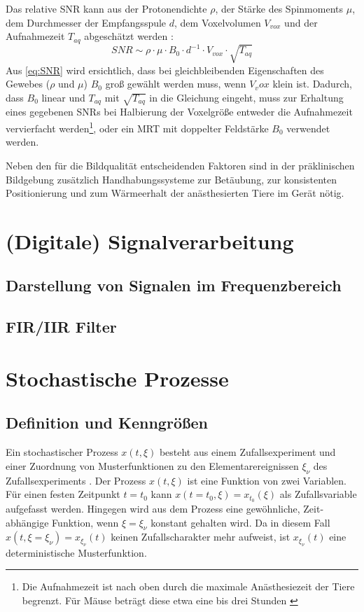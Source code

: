 Das relative SNR kann aus der Protonendichte $\rho$, der Stärke des Spinmoments $\mu$, dem Durchmesser der Empfangsspule $d$, dem Voxelvolumen $V_{vox}$ und der Aufnahmezeit $T_{aq}$ abgeschätzt werden \cite[S.~161]{Kiessling2017}:
\begin{equation}
\label{eq:SNR}
	SNR \sim \rho \cdot \mu \cdot B_0 \cdot d^{-1} \cdot V_{vox} \cdot \sqrt{T_{aq}}
\end{equation}
Aus \autoref{eq:SNR} wird ersichtlich, dass bei gleichbleibenden Eigenschaften des Gewebes ($\rho$ und $\mu$) $B_0$ groß gewählt werden muss, wenn $V_vox$ klein ist.
Dadurch, dass $B_0$ linear und $T_{aq}$ mit $\sqrt{T_{aq}}$ in die Gleichung eingeht, muss zur Erhaltung eines gegebenen SNRs bei Halbierung der Voxelgröße entweder die Aufnahmezeit vervierfacht werden\footnote{Die Aufnahmezeit ist nach oben durch die maximale Anästhesiezeit der Tiere begrenzt. Für Mäuse beträgt diese etwa eine bis drei Stunden \cite{Kiessling2017}}, oder ein MRT mit doppelter Feldstärke $B_0$ verwendet werden.

Neben den für die Bildqualität entscheidenden Faktoren sind in der präklinischen Bildgebung zusätzlich Handhabungssysteme zur Betäubung, zur konsistenten Positionierung und zum Wärmeerhalt der anästhesierten Tiere im Gerät nötig.

\section{(Digitale) Signalverarbeitung}

\subsection{Darstellung von Signalen im Frequenzbereich}
\subsection{FIR/IIR Filter}

\section{Stochastische Prozesse}

\subsection{Definition und Kenngrößen}
Ein stochastischer Prozess $x(t,\xi)$ besteht aus einem Zufallsexperiment und einer Zuordnung von Musterfunktionen zu den Elementarereignissen $\xi_\nu$ des Zufallsexperiments \cite[S.~243]{Leon2015}. Der Prozess $x(t,\xi)$ ist eine Funktion von zwei Variablen. Für einen festen Zeitpunkt $t=t_0$ kann $x(t=t_0,\xi)=x_{t_0}(\xi)$ als Zufallsvariable aufgefasst werden. Hingegen wird aus dem Prozess eine gewöhnliche, Zeit-abhängige Funktion, wenn $\xi=\xi_\nu$ konstant gehalten wird. Da in diesem Fall $x(t,\xi=\xi_\nu)=x_{\xi_\nu}(t)$ keinen Zufallscharakter mehr aufweist, ist $x_{\xi_\nu}(t)$ eine deterministische Musterfunktion.



